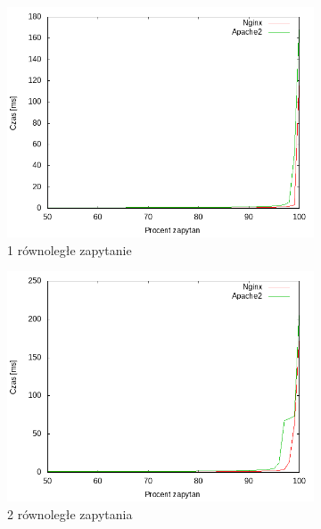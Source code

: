 \begin{figure}
	\centering
	\begin{subfigure}[h]{0.3\textwidth}
		\includegraphics[width=\textwidth]{testy/wybor_index_maly_1.png}
		\caption{1 równoległe zapytanie}
	\end{subfigure}
	\begin{subfigure}[h]{0.3\textwidth}
		\includegraphics[width=\textwidth]{testy/wybor_index_maly_2.png}
		\caption{2 równoległe zapytania}
	\end{subfigure}
	\begin{subfigure}[h]{0.3\textwidth}

\end{subfigure}
\end{figure}

